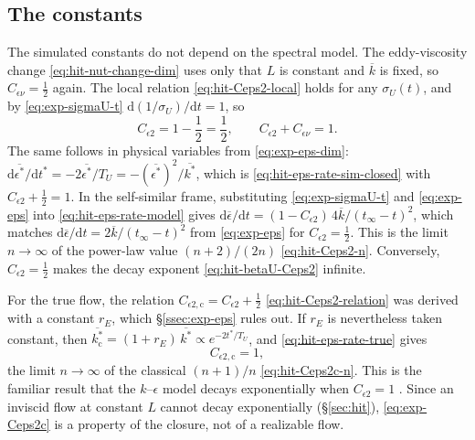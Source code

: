\documentclass{article}
\begin{document}
\subsection{The constants}\label{ssec:exp-constants}
The simulated constants do not depend on the spectral model. The
eddy-viscosity change \eqref{eq:hit-nut-change-dim} uses only that $L$ is
constant and $\overline{k}$ is fixed, so $C_{\epsilon\nu} = \tfrac12$ again.
The local relation \eqref{eq:hit-Ceps2-local} holds for any $\sigma_U(t)$, and
by \eqref{eq:exp-sigmaU-t} $\mathrm{d}(1/\sigma_U)/\mathrm{d}t = 1$, so
\begin{equation}\label{eq:exp-Ceps2}
  C_{\epsilon 2} = 1 - \frac{1}{2} = \frac{1}{2} ,
  \qquad
  C_{\epsilon 2} + C_{\epsilon\nu} = 1 .
\end{equation}
The same follows in physical variables from \eqref{eq:exp-eps-dim}:
$\mathrm{d}\overline{\epsilon^*}/\mathrm{d}t^* = -2\overline{\epsilon^*}/T_U
= -(\overline{\epsilon^*})^2/\overline{k^*}$, which is
\eqref{eq:hit-eps-rate-sim-closed} with $C_{\epsilon 2} + \tfrac12 = 1$. In the
self-similar frame, substituting \eqref{eq:exp-sigmaU-t} and \eqref{eq:exp-eps}
into \eqref{eq:hit-eps-rate-model} gives
$\mathrm{d}\overline{\epsilon}/\mathrm{d}t
= (1 - C_{\epsilon 2})\, 4\overline{k}/(t_\infty - t)^2$, which matches
$\mathrm{d}\overline{\epsilon}/\mathrm{d}t = 2\overline{k}/(t_\infty - t)^2$
from \eqref{eq:exp-eps} for $C_{\epsilon 2} = \tfrac12$. This is the limit
$n \to \infty$ of the power-law value $(n + 2)/(2n)$ \eqref{eq:hit-Ceps2-n}.
Conversely, $C_{\epsilon 2} = \tfrac12$ makes the decay exponent
\eqref{eq:hit-betaU-Ceps2} infinite.
\par
For the true flow, the relation $C_{\epsilon 2,\mathrm{c}} = C_{\epsilon 2} +
\tfrac12$ \eqref{eq:hit-Ceps2-relation} was derived with a constant $r_E$,
which \S\ref{ssec:exp-eps} rules out. If $r_E$ is nevertheless taken constant,
then $\overline{k_{\mathrm{c}}^*} = (1 + r_E)\, \overline{k^*} \propto
e^{-2t^*/T_U}$, and \eqref{eq:hit-eps-rate-true} gives
\begin{equation}\label{eq:exp-Ceps2c}
  C_{\epsilon 2,\mathrm{c}} = 1 ,
\end{equation}
the limit $n \to \infty$ of the classical $(n + 1)/n$ \eqref{eq:hit-Ceps2c-n}.
This is the familiar result that the $k$--$\epsilon$ model decays
exponentially when $C_{\epsilon 2} = 1$ \cite{pope2000turbulent}. Since an
inviscid flow at constant $L$ cannot decay exponentially (\S\ref{sec:hit}),
\eqref{eq:exp-Ceps2c} is a property of the closure, not of a realizable flow.
\end{document}
